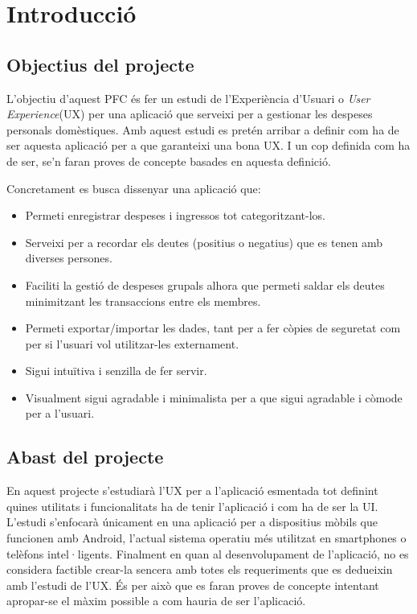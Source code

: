 \chapter{Introducció}

\section{Objectius del projecte}
L'objectiu d'aquest \ac{PFC} és fer un estudi de l'Experiència d'Usuari o \textit{User Experience}(UX) per una aplicació que serveixi per a gestionar les despeses personals domèstiques. Amb aquest estudi es pretén arribar a definir com ha de ser aquesta aplicació per a que garanteixi una bona \ac{UX}. I un cop definida com ha de ser, se'n faran proves de concepte basades en aquesta definició. 

Concretament es busca dissenyar una aplicació que:
\begin{itemize}
\item Permeti enregistrar despeses i ingressos tot categoritzant-los.
\item Serveixi per a recordar els deutes (positius o negatius) que es tenen amb diverses persones.
\item Faciliti la gestió de despeses grupals alhora que permeti saldar els deutes minimitzant les transaccions entre els membres.
\item Permeti exportar/importar les dades, tant per a fer còpies de seguretat com per si l'usuari vol utilitzar-les externament.
\item Sigui intuïtiva i senzilla de fer servir.
\item Visualment sigui agradable i minimalista per a que sigui agradable i còmode per a l'usuari.
\end{itemize}

\section{Abast del projecte}
En aquest projecte s'estudiarà l'\ac{UX} per a l'aplicació esmentada tot definint quines utilitats i funcionalitats ha de tenir l'aplicació i com ha de ser la \ac{UI}. L'estudi s'enfocarà únicament en una aplicació per a dispositius mòbils que funcionen amb \gls{Android}, l'actual sistema operatiu més utilitzat\cite{Android_OS} en \glspl{smartphone} o telèfons intel·ligents. 
Finalment en quan al desenvolupament de l'aplicació, no es considera factible crear-la sencera amb totes els requeriments que es dedueixin amb l'estudi de l'\ac{UX}. És per això que es faran proves de concepte intentant apropar-se el màxim possible a com hauria de ser l'aplicació. 